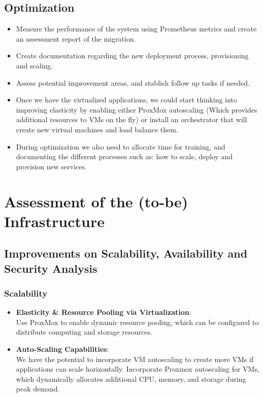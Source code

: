 \documentclass{llncs}
\begin{document}
\subsection{Optimization}

\begin{itemize}
  \item Measure the performance of the system using Prometheus metrics and create an assessment report of the migration.
        
  \item Create documentation regarding the new deployment process, provisioning and scaling.
        
  \item Assess potential improvement areas, and stablish follow up tasks if needed.
        
  \item Once we have the virtualized applications, we could start thinking into improving elasticity by enabling either ProxMox autoscaling (Which provides additional resources to VMs on the fly) or install an orchestrator that will create new virtual machines and load balance them.
        
  \item During optimization we also need to allocate time for training, and documenting the different processes such as: how to scale, deploy and provision new services.
\end{itemize}
\section{Assessment of the (to-be) Infrastructure}

\subsection{Improvements on Scalability, Availability and Security Analysis}

\subsubsection*{Scalability}

\begin{itemize}
  \item \textbf{Elasticity \& Resource Pooling via Virtualization}:
        \\
        Use ProxMox to enable dynamic resource pooling, which can be configured to distribute computing and storage resources.
        \\
  \item \textbf{Auto-Scaling Capabilities}:
        \\ 
        We have the potential to incorporate VM autoscaling to create more VMs if applications can scale horizontally.
        Incorporate Proxmox autoscaling for VMs, which dynamically allocates additional CPU, memory, and storage during peak demand.
        \\    
\end{itemize}
\end{document}
